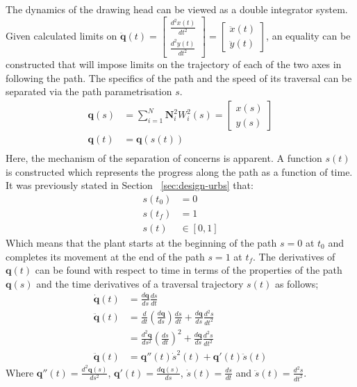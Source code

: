 The dynamics of the drawing head can be viewed as a double integrator system. Given calculated limits on $\ddot{\textbf{q}}(t)  = \begin{bmatrix}
\frac{d^2x(t)}{dt^2}\\
\frac{d^2y(t)}{dt^2}
\end{bmatrix}= \begin{bmatrix}
\ddot{x}(t)\\
\ddot{y}(t)
\end{bmatrix}$, an equality can be constructed that will impose limits on the trajectory of each of the two axes in following the path. The specifics of the path and the speed of its traversal can be separated via the path parametrisation $s$.
\begin{align*}
\textbf{q}(s) &= \sum^N_{i=1}\textbf{N}^2_iW^2_i(s) = \begin{bmatrix}
x(s)\\
y(s)
\end{bmatrix}\\
\textbf{q}(t) &= \textbf{q}\left(s(t)\right)\\
\end{align*}
Here, the mechanism of the separation of concerns is apparent. A function $s(t)$ is constructed which represents the progress along the path as a function of time. It was previously stated in Section ~\ref{sec:design-urbs} that:
\begin{align*}
s(t_0) &= 0\\
s(t_f) &= 1\\
s(t) &\in [0,1] 
\end{align*}
Which means that the plant starts at the beginning of the path $s = 0$ at $t_0$ and completes its movement at the end of the path $s = 1$ at $t_f$. The derivatives of $\textbf{q}(t)$ can be found with respect to time in terms of the properties of the path $\textbf{q}(s)$ and the time derivatives of a traversal trajectory $s(t)$ as follows;
\begin{align*}
\dot{\textbf{q}}(t) &= \frac{d\textbf{q}}{ds} \frac{ds}{dt}\\
\ddot{\textbf{q}}(t) &= \frac{d}{dt}\left(\frac{d\textbf{q}}{ds}\right)\frac{ds}{dt} +  \frac{d\textbf{q}}{ds}\frac{d^2s}{dt^2}\\
 &= \frac{d^2\textbf{q}}{ds^2}\left(\frac{ds}{dt}\right)^2 +  \frac{d\textbf{q}}{ds}\frac{d^2s}{dt^2}\\
 \ddot{\textbf{q}}(t) &= \textbf{q}''(t)\dot{s}^2(t) + \textbf{q}'(t)\ddot{s}(t)
\end{align*}
Where $\textbf{q}''(t) = \frac{d^2\textbf{q}(s)}{ds^2}$, $\textbf{q}'(t) = \frac{d\textbf{q}(s)}{ds}$, $\dot{s}(t) = \frac{ds}{dt}$ and $\ddot{s}(t) = \frac{d^2s}{dt^2}$.

